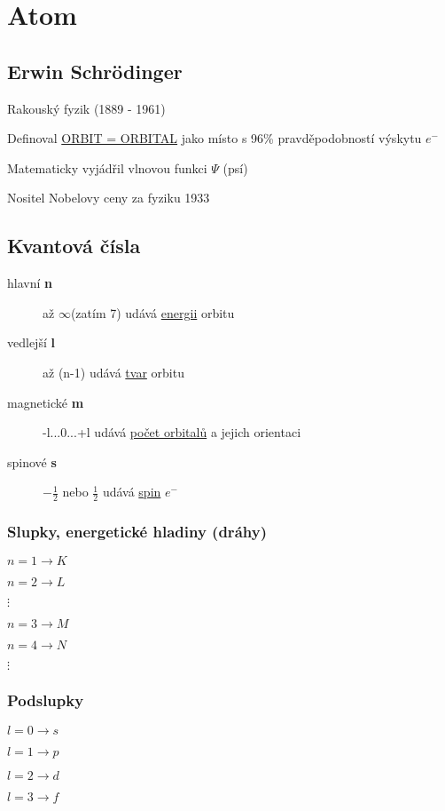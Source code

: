 \setlength{\parindent}{0px}
\section{Atom}
\subsection{Erwin Schrödinger}
Rakouský fyzik (1889 - 1961)

Definoval \underline{ORBIT = ORBITAL} jako místo s 96\% pravděpodobností výskytu $e^-$

Matematicky vyjádřil vlnovou funkci $\Psi$ (psí)

Nositel Nobelovy ceny za fyziku 1933

\TabPositions{0em, 12em, 25em}
\subsection{Kvantová čísla}
\begin{description}
    \item[hlavní \textbf{n}]  až $\infty$(zatím 7) \tab udává \underline{energii} orbitu
    \item[vedlejší \textbf{l}]  až (n-1) \tab udává \underline{tvar} orbitu
    \item[magnetické \textbf{m}] \tab -l...0...+l \tab udává \underline{počet orbitalů} a jejich orientaci
    \item[spinové \textbf{s}] \tab $-\frac{1}{2}$ nebo $\frac{1}{2}$ \tab udává \underline{spin} $e^-$
\end{description}

\centering
\subsubsection{Slupky, energetické hladiny (dráhy)}
\begin{multicols}{2}
    $n = 1 \to K$

    $n = 2 \to L$
    
    $\vdots$
    
    $n = 3 \to M$
    
    $n = 4 \to N$

    $\vdots$ 
\end{multicols}

\centering
\subsubsection{Podslupky}
\begin{multicols}{2}
    $l = 0 \to s$

    $l = 1 \to p$
    
    $l = 2 \to d$
    
    $l = 3 \to f$
\end{multicols}



